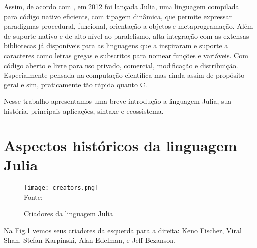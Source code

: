 Assim, de acordo com \cite{Bezanson2017}, em 2012 foi lançada Julia, uma linguagem compilada para código nativo eficiente, com tipagem dinâmica, que permite expressar paradigmas procedural, funcional, orientação a objetos e metaprogramação.  Além de suporte nativo e de alto nível ao paralelismo, alta integração com as extensas bibliotecas já disponíveis para as linguagens que a inspiraram e suporte a caracteres como letras gregas e subscritos para nomear funções e variáveis. Com código aberto e livre para uso privado, comercial, modificação e distribuição.
Especialmente pensada na computação científica mas ainda assim de propósito geral e sim, praticamente tão rápida quanto C. \cite{Lobianco2019,Bezanson2017}

 Nesse trabalho apresentamos uma breve introdução a linguagem Julia, sua história, principais aplicações, sintaxe e ecossistema. 





\newpage
\section{Aspectos históricos da linguagem Julia}

\begin{figure}[H]
   \begin{center}
       \caption{Criadores da linguagem Julia} \label{criadores}
       \texttt{[image: creators.png]} \\
       {\tiny \sf Fonte: \cite{Novet2015}}
   \end{center}
  \end{figure}

Na Fig.\ref{criadores} vemos seus criadores da esquerda para a direita: Keno Fischer, Viral Shah, Stefan Karpinski, Alan Edelman, e Jeff Bezanson.
\newline

